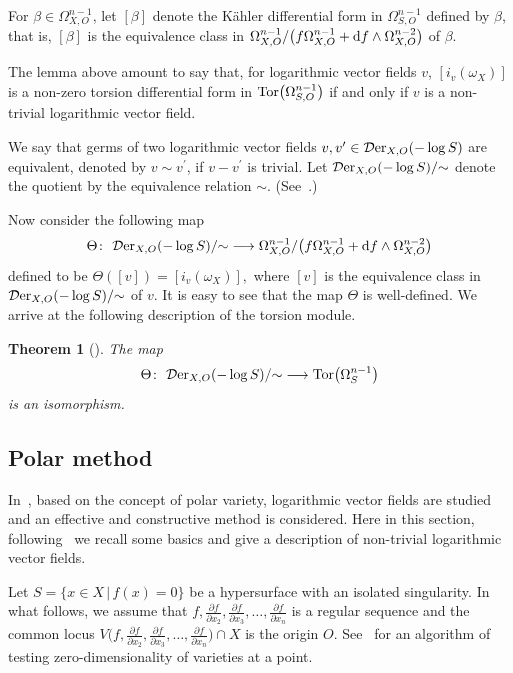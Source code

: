 \documentclass[pdftex]{sigma}%
\numberwithin{equation}{section}
\newtheorem{Theorem}{Theorem}[section]
\begin{document}
For $\beta \in \Omega_{X, O}^{n-1}$, let $[\beta]$ denote the K\"ahler differential form in $\Omega_{S, O}^{n-1}$ defined by $\beta$, that is, $[\beta]$ is the equivalence class in
$\Omega_{X, O}^{n-1} /\big(f \Omega_{X, O}^{n-1} + {\rm d}f\wedge \Omega_{X, O}^{n-2}\big)$ of $\beta$.


The lemma above amount to say that, for logarithmic vector fields $v$,
$[i_{v}(\omega_X)]$ is a non-zero torsion differential form
in ${\rm Tor}\big(\Omega_{S,O}^{n-1}\big)$ if and only if $v$ is a non-trivial logarithmic vector field.

We say that germs of two logarithmic vector fields $v, v^{\prime} \in {\mathcal D}{\rm er}_{X, O}(-\log S)$ are equivalent, denoted by $ v \sim v^{\prime} $, if $ v-v^{\prime} $ is trivial.
Let ${\mathcal D}{\rm er}_{X, O}(-\log S)/{\sim}$ denote the quotient by the equivalence relation $\sim$. (See~\cite{T}.)

Now consider the following map
\begin{gather*}
 \Theta\colon\ {\mathcal D}{\rm er}_{X, O}(-\log S)/{\sim} \longrightarrow
\Omega_{X, O}^{n-1} /\big(f \Omega_{X, O}^{n-1} + {\rm d}f\wedge \Omega_{X, O}^{n-2}\big)
\end{gather*}
defined to be $ \Theta([v]) = [i_{v}(\omega_X)], $ where $ [v] $ is the equivalence class in
${\mathcal D}{\rm er}_{X, O}(-\log S)/{\sim}$ of $v$. It is easy to see that the map $\Theta$ is well-defined. We arrive at the following description of the torsion module.

\begin{Theorem}[\cite{TN20}]
The map
\begin{gather*}
\Theta\colon\ {\mathcal D}{\rm er}_{X, O}(-\log S)/{\sim} \longrightarrow {\rm Tor}\big(\Omega_{S}^{n-1}\big)
\end{gather*}
is an isomorphism.
\end{Theorem}

\subsection{Polar method}

In~\cite{T}, based on the concept of polar variety, logarithmic vector fields are studied and an effective and constructive method is considered. Here in this section, following~\cite{NT19a, T} we recall some basics and give a description of non-trivial logarithmic vector fields.

Let $S =\{x \in X \,|\, f(x) =0\} $ be a hypersurface with an isolated singularity. In what fol\-lows,
we assume that $f, \frac{\partial f}{\partial x_2}, \frac{\partial f}{\partial x_3}, \ldots, \frac{\partial f}{\partial x_{n}}$ is a regular sequence and the common \mbox{locus}
$V\big(f, \frac{\partial f}{\partial x_2}, \frac{\partial f}{\partial x_3},\ldots,\allowbreak\frac{\partial f}{\partial x_{n}}\big)\cap X$
is the origin $O$. See~\cite{NT20b} for an algorithm of testing zero-dimensiona\-lity of varieties at a point.
\end{document}
